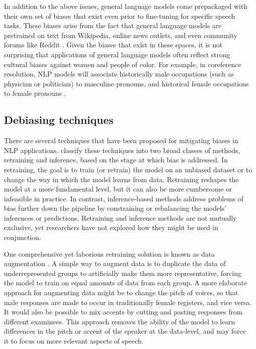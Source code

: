 \documentclass [PhD] {uclathes}
\begin{document}
In addition to the above issues, general language models come prepackaged with their own set of biases that exist even prior to fine-tuning for specific speech tasks. These biases arise from the fact that general language models are pretrained on text from Wikipedia, online news outlets, and even community forums like Reddit \citep{liu2019roberta}. Given the biases that exist in these spaces, it is not surprising that applications of general language models often reflect strong cultural biases against women and people of color. For example, in coreference resolution, NLP models will associate historically male occupations (such as physician or politician) to masculine pronouns, and historical female occupations to female pronouns \citep{zhao2018gender}.

\subsection{Debiasing techniques}

There are several techniques that have been proposed for mitigating biases in NLP applications. \citet{sun2019mitigating} classify these techniques into two broad classes of methods, retraining and inference, based on the stage at which bias is addressed. In retraining, the goal is to train (or retrain) the model on an unbiased dataset or to change the way in which the model learns from data. Retraining reshapes the model at a more fundamental level, but it can also be more cumbersome or infeasible in practice. In contrast, inference-based methods address problems of bias further down the pipeline by constraining or rebalancing the models’ inferences or predictions. Retraining and inference methods are not mutually exclusive, yet researchers have not explored how they might be used in conjunction.

One comprehensive yet laborious retraining solution is known as data augmentation \citep[e.g.][]{zhao2018gender}. A simple way to augment data is to duplicate the data of underrepresented groups to artificially make them more representative, forcing the model to train on equal amounts of data from each group. A more elaborate approach for augmenting data might be to change the pitch of voices, so that male responses are made to occur in traditionally female registers, and vice versa. It would also be possible to mix accents by cutting and pasting responses from different examinees. This approach removes the ability of the model to learn differences in the pitch or accent of the speaker at the data-level, and may force it to focus on more relevant aspects of speech.
\end{document}
